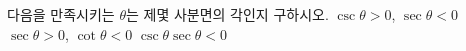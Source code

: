 다음을 만족시키는 $\theta$는 제몇 사분면의 각인지 구하시오.
 $\csc\theta>0$, $\sec\theta<0$
 $\sec\theta>0$, $\cot\theta<0$
 $\csc\theta\sec\theta<0$
